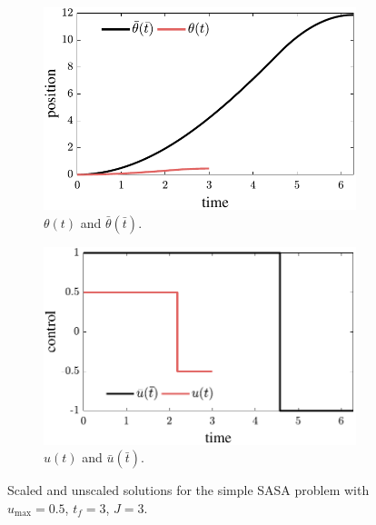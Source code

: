 \begin{figure}
\centering
\begin{subfigure}[b]{0.5\columnwidth}
    \centering
    \includegraphics[width=\textwidth]{../ch4/figures/TP3_position}
    \caption{$\theta(t)$ and $\bar{\theta}(\bar{t})$.}
\end{subfigure}%
\begin{subfigure}[b]{0.5\columnwidth}
    \centering
    \includegraphics[width=\textwidth]{../ch4/figures/TP3_control}
    \caption{$u(t)$ and $\bar{u}(\bar{t})$.\label{fig:ch4:sasa_control}}
\end{subfigure}
\caption[Scaled and unscaled solutions for the simple SASA problem]{Scaled and unscaled solutions for the simple SASA problem with $u_{\max} = 0.5$, $t_f = 3$, $J = 3$.\label{fig:ch4:sasa_plots}}
\end{figure}
